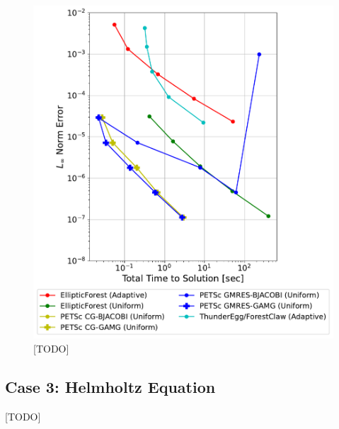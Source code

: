 \begin{figure}
    \centering
    \includegraphics[width=1.0\textwidth, clip=true, trim={0 0 0 0}]{figures/case02-work-precision-plots-no-title.pdf}
    \caption{[TODO]}
    \label{fig:case02-work-precision-plot}
\end{figure}

\subsection{Case 3: Helmholtz Equation}

[TODO]

